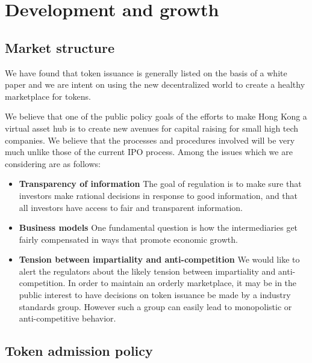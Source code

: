 \chapter{Development and growth}

\section{Market structure}


We have found that token issuance is generally listed on the basis of
a white paper and we are intent on using the new decentralized world
to create a healthy marketplace for tokens.

We believe that one of the public policy goals of the efforts to make
Hong Kong a virtual asset hub is to create new avenues for capital
raising for small high tech companies.  We believe that the processes
and procedures involved will be very much unlike those of the current
IPO process.  Among the issues which we are considering are as
follows:

\begin{itemize}

\item  {\bf Transparency of information} The goal of regulation is to make
  sure that investors make rational decisions in response to good
  information, and that all investors have access to fair and
  transparent information.

\item  {\bf Business models} One fundamental question is how the
  intermediaries get fairly compensated in ways that promote economic
  growth.

\item  {\bf Tension between impartiality and anti-competition} We would
  like to alert the regulators about the likely tension between
  impartiality and anti-competition.  In order to maintain an orderly
  marketplace, it may be in the public interest to have decisions on
  token issuance be made by a industry standards group.  However such
  a group can easily lead to monopolistic or anti-competitive
  behavior.
\end{itemize}

\section{Token admission policy}

